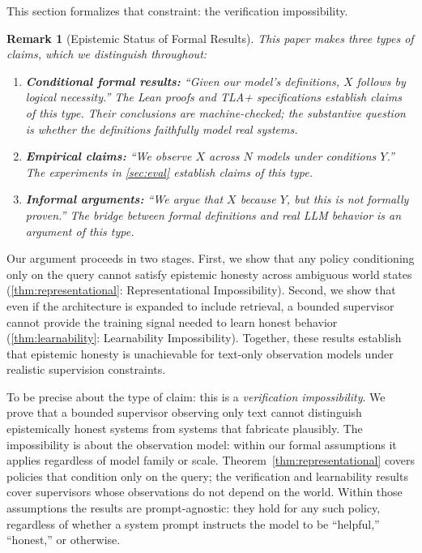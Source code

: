 \documentclass[11pt]{article}
\newtheorem{remark}{Remark}
\begin{document}
This section formalizes that constraint: the verification impossibility.

\begin{remark}[Epistemic Status of Formal Results]
This paper makes three types of claims, which we distinguish throughout:
\begin{enumerate}
\item \textbf{Conditional formal results:} ``Given our model's definitions, $X$ follows by logical necessity.'' The Lean proofs and TLA+ specifications establish claims of this type. Their conclusions are machine-checked; the substantive question is whether the definitions faithfully model real systems.
\item \textbf{Empirical claims:} ``We observe $X$ across $N$ models under conditions $Y$.'' The experiments in \autoref{sec:eval} establish claims of this type.
\item \textbf{Informal arguments:} ``We argue that $X$ because $Y$, but this is not formally proven.'' The bridge between formal definitions and real LLM behavior is an argument of this type.
\end{enumerate}
\end{remark}

Our argument proceeds in two stages. First, we show that any policy conditioning
only on the query cannot satisfy epistemic honesty across ambiguous world states
(\autoref{thm:representational}: Representational Impossibility). Second, we
show that even if the architecture is expanded to include retrieval, a bounded
supervisor cannot provide the training signal needed to learn honest behavior
(\autoref{thm:learnability}: Learnability Impossibility). Together, these
results establish that epistemic honesty is unachievable for text-only
observation models under realistic supervision constraints.

To be precise about the type of claim: this is a \emph{verification impossibility}.
We prove that a bounded supervisor observing only text cannot distinguish
epistemically honest systems from systems that fabricate plausibly. The
impossibility is about the observation model: within our formal assumptions it
applies regardless of model family or scale. Theorem~\ref{thm:representational}
covers policies that condition only on the query; the verification and
learnability results cover supervisors whose observations do not depend on the
world. Within those assumptions the results are prompt-agnostic: they hold for any such policy,
regardless of whether a system prompt instructs the model to be ``helpful,''
``honest,'' or otherwise.
\end{document}
